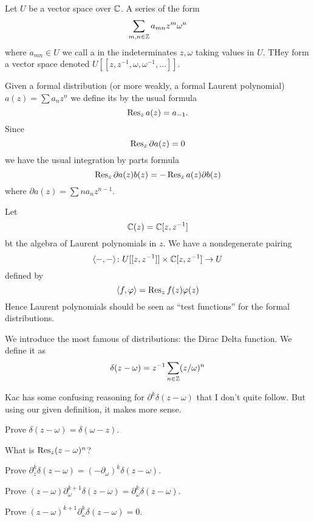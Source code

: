 \M
Let $U$ be a vector space over $\CC$. A series of the form
\begin{equation}
\sum_{m,n\in\ZZ}a_{mn}z^{m}\omega^{n}
\end{equation}
where $a_{mn}\in U$ we call a  in the
indeterminates $z,\omega$ taking values in $U$. THey form a vector space
denoted $U[[z,z^{-1},\omega,\omega^{-1},\dots]]$. 

\M
Given a formal distribution (or more weakly, a formal Laurent polynomial)
$a(z) = \sum a_{n}z^{n}$ we define its  by the usual
formula
\begin{equation}
\Res[z]{a(z)} = a_{-1}.
\end{equation}
Since
\begin{equation}
\Res[z]{\partial a(z)}=0
\end{equation}
we have the usual integration by parts formula
\begin{equation}
\Res[z]{\partial a(z)b(z)}=-\Res[z]{a(z)\partial b(z)}
\end{equation}
where $\partial a(z)=\sum na_{n}z^{n-1}$.

\M
Let
\begin{equation}
\CC(z)=\CC[z,z^{-1}]
\end{equation}
bt the algebra of Laurent polynomials in $z$. We have a nondegenerate
pairing
\begin{equation}
\<-,-\>\colon U[[z,z^{-1}]]\times\CC[z,z^{-1}]\to U
\end{equation}
defined by
\begin{equation}
\<f,\varphi\>=\Res[z]{f(z)\varphi(z)}
\end{equation}
Hence Laurent polynomials should be seen as ``test functions'' for the
formal distributions.

\M
We introduce the most famous of distributions: the Dirac Delta
function. We define it as
\begin{equation}
\delta(z-\omega)
=z^{-1}\sum_{n\in\ZZ}(z/\omega)^{n}
\end{equation}
\begin{rmk}
Kac has some confusing reasoning for $\partial^{k}\delta(z-\omega)$ that
I don't quite follow. But using our given definition, it makes more sense.
\end{rmk}

\begin{xca}
Prove $\delta(z-\omega)=\delta(\omega-z)$.
\end{xca}
\begin{xca}
What is $\Res[z]{(z-\omega)^{n}}$?
\end{xca}
\begin{xca}
Prove $\partial^{k}_{z}\delta(z-\omega)=(-\partial_{\omega})^{k}\delta(z-\omega)$.
\end{xca}
\begin{xca}\label{xca:deltaDerivative}%
Prove $(z-\omega)\partial^{k+1}_{\omega}\delta(z-\omega)=\partial^{k}_{\omega}\delta(z-\omega)$.
\end{xca}
\begin{xca}\label{xca:usefulForCor3}%
Prove $(z-\omega)^{k+1}\partial^{k}_{\omega}\delta(z-\omega)=0$.
\end{xca}

